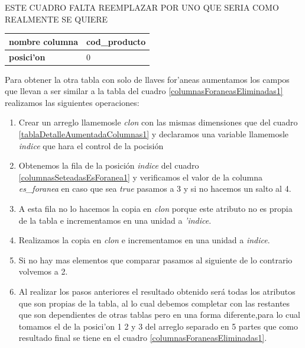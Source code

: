 ESTE CUADRO FALTA REEMPLAZAR POR UNO QUE SERIA COMO REALMENTE SE QUIERE

\begin{center}
  \label{columnasForaneasEliminadas1} %
  \begin{tabular}{|l|l|}
  \hline 
  \textbf{nombre columna} & cod\_producto \\ \hline
  \textbf{posici'on}      & 0             \\ \hline
  \end{tabular}
\end{center}
Para obtener la otra tabla con solo de llaves for'aneas aumentamos los campos que llevan a ser similar a la tabla del cuadro \ref{columnasForaneasEliminadas1} realizamos las siguientes operaciones:
 \begin{enumerate}
 \item Crear un arreglo llamemosle \textit{clon} con las mismas dimensiones que del cuadro \ref{tablaDetalleAumentadaColumnas1} y declaramos una variable llamemosle \textit{indice} que hara el control de la pocisi\'on  
 \item Obtenemos la fila de la posici\'on \textit{indice} del cuadro \ref{columnasSeteadasEsForanea1} y verificamos el valor de la columna \textit{es\_foranea} en caso que sea \textit{true} pasamos a 3 y si no hacemos un salto al 4.
 \item A esta fila no lo hacemos la copia en \textit{clon} porque este atributo no es propia de la tabla e incrementamos en una unidad a \textit{'indice}.
 \item Realizamos la copia en \textit{clon} e incrementamos en una unidad a \textit{indice}.
 \item Si no hay mas elementos que comparar pasamos al siguiente de lo contrario volvemos a 2.
 \item Al realizar los pasos anteriores el resultado obtenido ser\'a todas los atributos que son propias de la tabla, al lo cual debemos completar con las restantes que son dependientes de otras tablas pero en una forma diferente,para lo cual tomamos el de la posici'on 1 2 y 3 del arreglo separado en 5 partes que como resultado final se tiene en el cuadro \ref{columnasForaneasEliminadas1}.
 \end{enumerate}